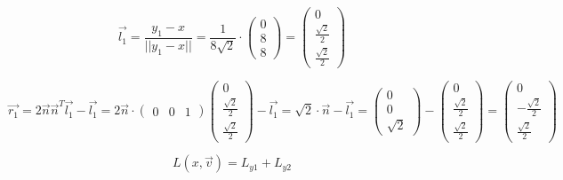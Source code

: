 \documentclass{article}
\begin{document}
\[
\overrightarrow{l_1}=\frac{y_1-x}{||y_1-x||}=\frac{1}{8\sqrt{2}}\cdot
\begin{pmatrix}
0\\8\\8
\end{pmatrix}=
\begin{pmatrix}
0\\ \frac{\sqrt{2}}{2}\\ \frac{\sqrt{2}}{2}
\end{pmatrix}
\]

\[
\overrightarrow{r_1}=2\overrightarrow{n}\overrightarrow{n}^T\overrightarrow{l_1}-\overrightarrow{l_1}=
2\overrightarrow{n}\cdot
\begin{pmatrix}
0&0&1
\end{pmatrix}
\begin{pmatrix}
0\\ \frac{\sqrt{2}}{2}\\ \frac{\sqrt{2}}{2}
\end{pmatrix}
-\overrightarrow{l_1}=\sqrt{2}\cdot \overrightarrow{n}-\overrightarrow{l_1}=
\begin{pmatrix}
0\\0 \\ \sqrt{2}
\end{pmatrix}-
\begin{pmatrix}
0\\ \frac{\sqrt{2}}{2}\\ \frac{\sqrt{2}}{2}
\end{pmatrix}=
\begin{pmatrix}
0\\ -\frac{\sqrt{2}}{2}\\ \frac{\sqrt{2}}{2}
\end{pmatrix}
\]

\[
L(x,\overrightarrow{v})=L_{y1} + L_{y2}
\]
\end{document}
